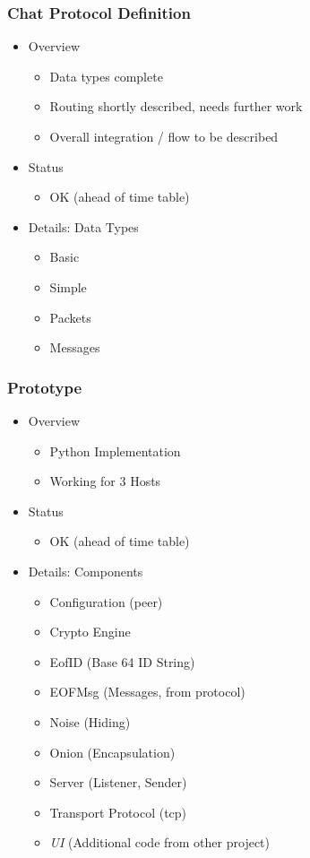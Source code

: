 \documentclass{beamer}
\begin{document}
\frame
{
  \frametitle{Chat Protocol Definition}
  \begin{itemize}
     \item Overview
      \begin{itemize}
          \item Data types complete
          \item Routing shortly described, needs further work
          \item Overall integration / flow to be described
      \end{itemize}
      \item Status
      \begin{itemize}
          \item OK (ahead of time table)
      \end{itemize}
      \pause \item Details: Data Types 
      \begin{itemize}
          \item Basic
          \item Simple
          \item Packets
          \item Messages
      \end{itemize}
   \end{itemize}
}

\frame
{
  \frametitle{Prototype}
  \begin{itemize}
     \item Overview
      \begin{itemize}
          \item Python Implementation
          \item Working for 3 Hosts
      \end{itemize}
      \item Status
      \begin{itemize}
          \item OK (ahead of time table)
      \end{itemize}
      \pause \item Details: Components
      \begin{itemize}
          \item Configuration (peer)
          \item Crypto Engine
          \item EofID (Base 64 ID String)
          \item EOFMsg (Messages, from protocol)
          \item Noise (Hiding)
          \item Onion (Encapsulation)
          \item Server (Listener, Sender)
          \item Transport Protocol (tcp)
          \item \textit{UI} (Additional code from other project)
      \end{itemize}
   \end{itemize}
}
\end{document}
